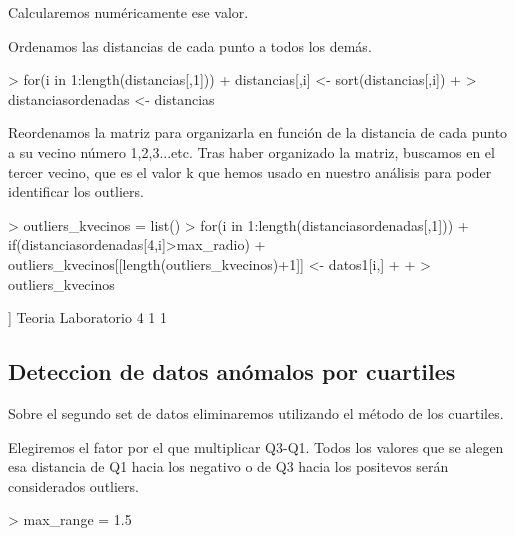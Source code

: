 \documentclass [a4paper] {article}
\begin{document}
Calcularemos numéricamente ese valor.

Ordenamos las distancias de cada punto a todos los demás.
\begin{Schunk}
\begin{Sinput}
> for(i in 1:length(distancias[,1])){
+   distancias[,i] <- sort(distancias[,i])
+ }
> distanciasordenadas <- distancias
\end{Sinput}
\end{Schunk}

Reordenamos la matriz para organizarla en función de la distancia de cada punto a su vecino número 1,2,3...etc. 
Tras haber organizado la matriz, buscamos en el tercer vecino, que es el valor k que hemos usado en nuestro análisis para poder identificar los outliers.
\begin{Schunk}
\begin{Sinput}
> outliers_kvecinos = list()
> for(i in 1:length(distanciasordenadas[,1])){
+   if(distanciasordenadas[4,i]>max_radio){
+     outliers_kvecinos[[length(outliers_kvecinos)+1]] <- datos1[i,]
+   }
+ }
> outliers_kvecinos
\end{Sinput}
\begin{Soutput}
[[1]]
  Teoria Laboratorio
4      1           1
\end{Soutput}
\end{Schunk}

\newpage
\subsection{Deteccion de datos anómalos por cuartiles}
Sobre el segundo set de datos eliminaremos utilizando el método de los cuartiles.

Elegiremos el fator por el que multiplicar Q3-Q1.
Todos los valores que se alegen esa distancia de Q1 hacia los negativo o de Q3 hacia los positevos serán considerados outliers.
\begin{Schunk}
\begin{Sinput}
> max_range = 1.5
\end{Sinput}
\end{Schunk}
\end{document}
